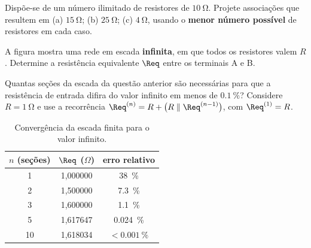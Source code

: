 \begin{questao}[3]{}

Dispõe-se de um número ilimitado de resistores de $\SI{10}{\ohm}$. Projete
associações que resultem em (a) $\SI{15}{\ohm}$; (b) $\SI{25}{\ohm}$;
(c) $\SI{4}{\ohm}$, usando o \textbf{menor número possível} de resistores em cada
caso.


\end{questao}

\blocodesafio
\begin{questao}[4]{}

A figura mostra uma rede em escada \textbf{infinita}, em que todos os resistores
valem $R$. Determine a resistência equivalente $\Req$ entre os terminais A e B.




\end{questao}
\begin{questao}[4]{}

Quantas seções da escada da questão anterior são necessárias para que a
resistência de entrada difira do valor infinito em menos de
$\SI{0.1}{\percent}$? Considere $R = \SI{1}{\ohm}$ e use a recorrência
$\Req^{(n)} = R + \big(R \parallel \Req^{(n-1)}\big)$, com
$\Req^{(1)} = R$.

\begin{table}[H]
\centering\small\sffamily
\begin{tabular}{@{}c c c@{}}
\toprule
\textbf{$n$ (seções)} & \textbf{$\Req$ ($\Omega$)} & \textbf{erro relativo}\\
\midrule
1  & 1,000000 & \SI{38}{\percent}\\
2  & 1,500000 & \SI{7.3}{\percent}\\
3  & 1,600000 & \SI{1.1}{\percent}\\
5  & 1,617647 & \SI{0.024}{\percent}\\
10 & 1,618034 & $<\SI{0.001}{\percent}$\\
\bottomrule
\end{tabular}
\caption{Convergência da escada finita para o valor infinito.}
\end{table}



\end{questao}
